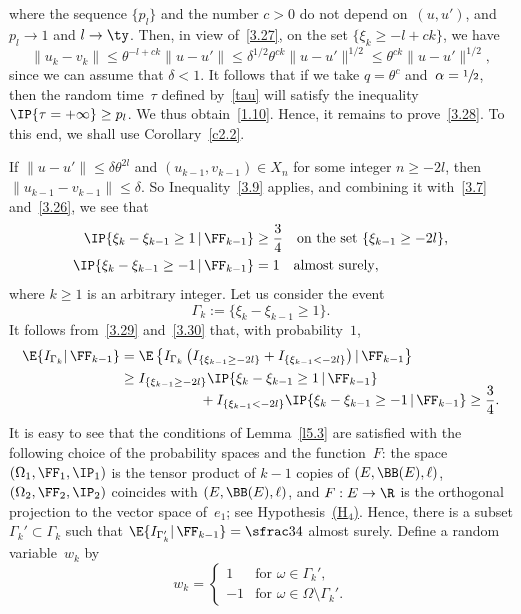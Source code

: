 where the sequence $\{p_l\}$ and the number $c>0$ do not depend on~$(u,u')$, and $p_l\to 1$ and $l\to \ty$. Then, in view of~\eqref{3.27}, on the set $\{\xi_k\ge -l+ck\}$, we have
\[
\|u_k-v_k\|\le \theta^{-l+ck}\|u-u'\|
\le \delta^{1/2}\theta^{ck}\|u-u'\|^{1/2}\le \theta^{ck}\|u-u'\|^{1/2},
\]
since we can assume that $\delta<1$.
It follows that if we take $q=\theta^c$ and~$\alpha=\sfrac12$, then the random time~$\tau$ defined by~\eqref{tau} will satisfy the inequality $\IP\{\tau=+\infty\}\ge p_l$. We thus obtain~\eqref{1.10}. Hence, it remains to prove~\eqref{3.28}. To this end, we shall use Corollary~\ref{c2.2}.

If $\|u-u'\|\le \delta\theta^{2l}$ and $(u_{k-1}, v_{k-1})\in X_{n}$ for some integer $n\ge -2l$, then \hbox{$\|u_{k-1}-v_{k-1}\|\le\delta$}. So Inequality~\eqref{3.9} applies, and combining it with~\eqref{3.7} and~\eqref{3.26}, we see that
\begin{align}
\IP\{\xi_k-\xi_{k-1}\ge 1\,|\,\FF_{k-1}\}&\ge \frac34\quad
\text{on the set $\{\xi_{k-1}\ge -2l$\}},\label{3.29}\\
\IP\{\xi_k-\xi_{k-1}\ge -1\,|\,\FF_{k-1}\}&=1\quad
\text{almost surely},\label{3.30}
\end{align}
where $k\ge1$ is an arbitrary integer. Let us consider the event
\[
\Gamma_k:=\{\xi_k-\xi_{k-1}\ge 1 \}.
\]
It follows from~\eqref{3.29} and~\eqref{3.30} that, with probability~$1$,
\begin{align*}
\E\{I_{\Gamma_k}|\,\FF_{k-1}\}&=\E\left\{I_{\Gamma_k} \left(I_{\{\xi_{k-1}\ge -2l\}}
+I_{\{\xi_{k-1}< -2l\}}\right)|\,\FF_{k-1}\right\}\\
&\ge I_{\{\xi_{k-1}\ge -2l\}}\IP\{\xi_k-\xi_{k-1}\ge 1\,|\,\FF_{k-1}\}
\\[-5pt]
&\hspace*{2cm} +I_{\{\xi_{k-1}< -2l\}}\IP\{\xi_k-\xi_{k-1}\ge -1\,|\,\FF_{k-1}\}\ge \frac34.
\end{align*}
It is easy to see that the conditions of Lemma~\ref{l5.3} are satisfied with the following choice of the probability spaces and the function~$F$: the space $(\Omega_1,\FF_1,\IP_1)$ is the tensor product of $k-1$ copies of $(E,\BB(E),\ell)$, $(\Omega_2,\FF_2,\IP_2)$ coincides with $(E,\BB(E),\ell)$, and $F:E\to\R$ is the orthogonal projection to the vector space of~$e_1$; see Hypothesis~\hyperlink{H4}{(H$_4$)}. Hence, there is a subset $\Gamma_k'\subset\Gamma_k$ such that $\E\{I_{\Gamma_k'}|\,\FF_{k-1}\}=\sfrac34$ almost surely. Define a random variable~$w_k$ by
\[
w_k=
\begin{cases}
1&\text{for $\omega\in\Gamma_k'$},\\[3pt]
-1&\text{for $\omega\in\Omega\setminus\Gamma_k'$}.
\end{cases}
\]
